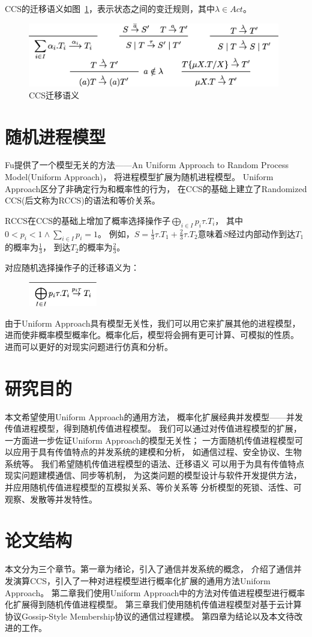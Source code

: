    CCS的迁移语义如图~\ref{fig_ccs}，表示状态之间的变迁规则，其中$\lambda \in Act$。

   \begin{figure}[!htbp]
    \small
    \centering
    \includegraphics[width=11cm]{../figure/ccs.png}
    \caption[]{CCS迁移语义}
     \label{fig_ccs}
 \end{figure}

   \section{随机进程模型}

   Fu提供了一个模型无关的方法——An Uniform Approach to Random Process Model(Uniform Approach)，
   将进程模型扩展为随机进程模型。
   Uniform Approach区分了非确定行为和概率性的行为，
   在CCS的基础上建立了Randomized CCS(后文称为RCCS)的语法和等价关系。

   RCCS在CCS的基础上增加了概率选择操作子$\bigoplus_{i\in I}p_i\tau.T_i$，
   其中$0<p_i<1 \wedge \sum_{i\in I}p_i = 1$。
   例如，$S=\frac{1}{3}\tau.T_1+\frac{2}{3}\tau.T_2$意味着$S$经过内部动作到达$T_1$的概率为$\frac{1}{3}$，
   到达$T_2$的概率为$\frac{2}{3}$。

   对应随机选择操作子的迁移语义为：
   \begin{figure}[!htbp]
    \small
    \centering
    \includegraphics[width=3cm]{../figure/rccs.png}
     \label{fig_rccs}
 \end{figure}

   由于Uniform Approach具有模型无关性，我们可以用它来扩展其他的进程模型，
   进而使非概率模型概率化。概率化后，模型将会拥有更可计算、可模拟的性质。
   进而可以更好的对现实问题进行仿真和分析。

\section{研究目的}
本文希望使用Uniform Approach的通用方法，
概率化扩展经典并发模型——并发传值进程模型，得到随机传值进程模型。
我们可以通过对传值进程模型的扩展，
一方面进一步佐证Uniform Approach的模型无关性；
一方面随机传值进程模型可以应用于具有传值特点的并发系统的建模和分析，
如通信过程、安全协议、生物系统等。
我们希望随机传值进程模型的语法、迁移语义
可以用于为具有传值特点现实问题建模通信、同步等机制，
为这类问题的模型设计与软件开发提供方法，
并应用随机传值进程模型的互模拟关系、等价关系等
分析模型的死锁、活性、可观察、发散等并发特性。

\section{论文结构}
本文分为三个章节。第一章为绪论，引入了通信并发系统的概念，
介绍了通信并发演算CCS，引入了一种对进程模型进行概率化扩展的通用方法Uniform Approach。
第二章我们使用Uniform Approach中的方法对传值进程模型进行概率化扩展得到随机传值进程模型。
第三章我们使用随机传值进程模型对基于云计算协议Gossip-Style Membership协议的通信过程建模。
第四章为结论以及本文待改进的工作。
